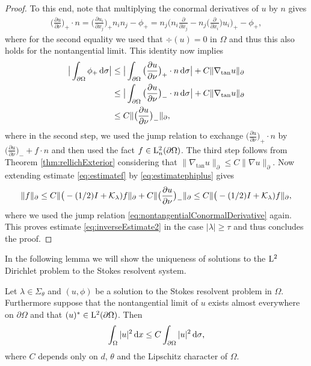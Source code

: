 \begin{proof}
  To this end, note that multiplying the conormal derivatives of $u$ by $n$ gives
  \begin{align*}
    \big( \frac{\partial u}{\partial \nu} \big)_+ \cdot n
    = \big( \frac{\partial u_i}{\partial x_j}\big)_+ n_i n_j - \phi_+
    = n_j \big( n_i \frac{\partial}{\partial x_j} - n_j \big( \frac{\partial}{\partial x_i} \big) u_i \big)_+ - \phi_+,
  \end{align*}
  where for the second equality we used that $\div(u) = 0$ in $\Omega$ and thus this also holds for the nontangential limit.
  This identity now implies
  \begin{align}
    \big| \int_{\partial\Omega} \phi_+ \, {\operatorname{d}\!{\sigma}} \big|
    &\leq \big| \int_{\partial\Omega} \big( \frac{\partial u}{\partial \nu} \big)_+ \cdot n \, {\operatorname{d}\!{\sigma}} \big|  + C \|\nabla_{\mathrm{tan}} u \|_{\partial} \nonumber\\
    &\leq \big| \int_{\partial\Omega} \big( \frac{\partial u}{\partial \nu} \big)_- \cdot n \, {\operatorname{d}\!{\sigma}} \big| + C \| \nabla_{\mathrm{tan}} u\|_\partial \nonumber\\
    \label{eq:estimatephiplus}
    &\leq C \| \big( \frac{\partial u}{\partial \nu} \big)_- \|_\partial,
  \end{align}
  where in the second step, we used the jump relation to exchange $\big(\frac{\partial u}{\partial \nu}\big)_+ \cdot n$ by $\big(\frac{\partial u}{\partial \nu} \big)_- + f \cdot n$ and then used the fact $f \in \mathrm{L}^2_n(\partial\Omega)$.
  The third step follows from Theorem \ref{thm:rellichExterior} considering that $\|\nabla_{\mathrm{tan}} u \|_\partial \leq C \|\nabla u \|_{\partial}$.
  Now extending estimate \eqref{eq:estimatef} by \eqref{eq:estimatephiplus} gives
  \begin{align*}
    \| f\|_\partial 
    \leq C \| \big( - (1/2) I + \mathcal{K}_\lambda) f \|_\partial + C \| \big(\frac{\partial u}{\partial \nu} \big)_- \|_\partial 
    \leq C \| \big( - (1/2) I + \mathcal{K}_\lambda) f\|_{\partial},
  \end{align*}
  where we used the jump relation \eqref{eq:nontangentialConormalDerivative} again.
  This proves estimate \eqref{eq:inverseEstimate2} in the case $|\lambda| \geq \tau$ and thus concludes the proof.
\end{proof}

In the following lemma we will show the uniqueness of solutions to the $\mathrm{L}^2$ Dirichlet problem to the Stokes resolvent system.

\begin{lem}
  \label{lem:l2unique}
  Let $\lambda \in \Sigma_\theta$ and $(u,\phi)$ be a solution to the Stokes resolvent problem in $\Omega$.
  Furthermore suppose that the nontangential limit of $u$ exists almost everywhere on $\partial\Omega$ and that $(u)^* \in \mathrm{L}^2(\partial\Omega)$.
  Then 
  \begin{align}
    \label{eq:OmegaBoundaryEstimate}
    \int_\Omega |u|^2 \, {\operatorname{d}\!{x}} \leq C \int_{\partial\Omega} |u|^2 \, {\operatorname{d}\!{\sigma}},
  \end{align}
  where $C$ depends only on $d$, $\theta$ and the Lipschitz character of $\Omega$.
\end{lem}

